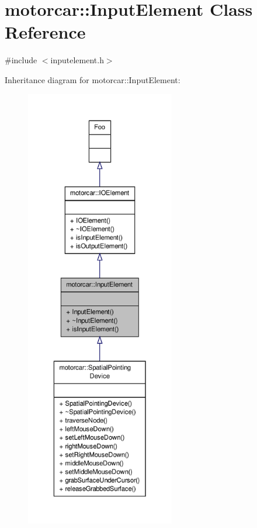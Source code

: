 \hypertarget{classmotorcar_1_1InputElement}{\section{motorcar\-:\-:Input\-Element Class Reference}
\label{classmotorcar_1_1InputElement}
}


{\ttfamily \#include $<$inputelement.\-h$>$}



Inheritance diagram for motorcar\-:\-:Input\-Element\-:
\nopagebreak
\begin{figure}[H]
\begin{center}
\leavevmode
\includegraphics[height=550pt]{classmotorcar_1_1InputElement__inherit__graph}
\end{center}
\end{figure}


